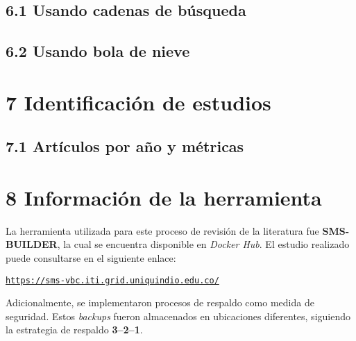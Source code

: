 \subsection*{6.1 Usando cadenas de búsqueda}
\label{subsec:cadenaBusqueda}


\subsection*{6.2 Usando bola de nieve}
\label{subsec:bolaNieveBusqueda}


\section*{7 Identificación de estudios}
\label{sec:identificacionEstudios}

\subsection*{7.1 Artículos por año y métricas}
\label{subsec:articulosPorAnoYMetrica}


\section*{8 Información de la herramienta}
\label{subsec:informacionHerramienta}

\noindent
La herramienta utilizada para este proceso de revisión de la literatura fue \textbf{SMS-BUILDER}, la cual se encuentra disponible en \textit{Docker Hub}. El estudio realizado puede consultarse en el siguiente enlace:

\begin{center}
\href{https://sms-vbc.iti.grid.uniquindio.edu.co/}{\texttt{https://sms-vbc.iti.grid.uniquindio.edu.co/}}
\end{center}

\noindent
Adicionalmente, se implementaron procesos de respaldo como medida de seguridad. Estos \textit{backups} fueron almacenados en ubicaciones diferentes, siguiendo la estrategia de respaldo \textbf{3--2--1}.
